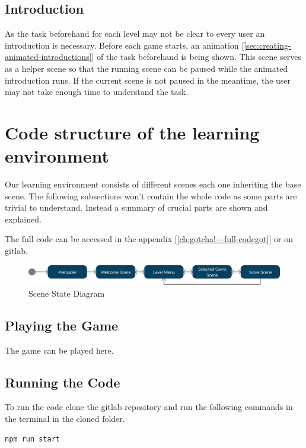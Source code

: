 \subsection{Introduction}\label{subsec:introduction}
As the task beforehand for each level may not be clear to every user an introduction is necessary.
Before each game starts, an animation [\ref{sec:creating-animated-introductions}] of the task beforehand is being shown.
This scene serves as a helper scene so that the running scene can be paused while the animated introduction runs.
If the current scene is not paused in the meantime, the user may not take enough time to understand the task.

\section{Code structure of the learning environment}\label{sec:code-structure-of-the-learning-environment}
Our learning environment consists of different scenes each one inheriting the base scene.
The following subsections won't contain the whole code as some parts are trivial to understand.
Instead a summary of crucial parts are shown and explained.

The full code can be accessed in the appendix [\ref{ch:gotcha!---full-codegot}] or on gitlab\cite{gitlab-thesis}.

\begin{figure}[H]
    \centering
    \includegraphics[width=1\textwidth]{figures/statediagram}
    \caption{Scene State Diagram}
    \label{fig:statediagram}
\end{figure}
\subsection{Playing the Game}\label{subsec:playing-the-game}
The game can be played here\cite{gotscha}.

\subsection{Running the Code}\label{subsec:running-the-code}
To run the code clone the gitlab repository\cite{gitlab-thesis} and run the following commands in the terminal in the cloned folder.

\begin{lstlisting}[style=TypeScript, caption={BaseScene.ts}]
    npm run start
\end{lstlisting}

